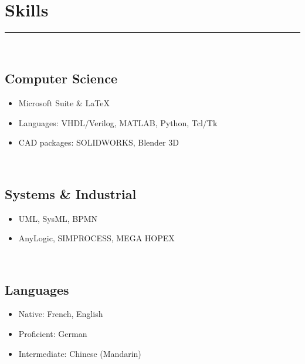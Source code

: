 \documentclass[10pt]{article}
\begin{document}
\section*{Skills}
\rule{\linewidth}{1pt}\\[0.2cm]
\begin{minipage}[t]{0.32\linewidth}
    \subsection*{Computer Science}
    \begin{itemize}
        \item Microsoft Suite \& \LaTeX
        \item Languages: VHDL/Verilog, MATLAB, Python, Tcl/Tk
        \item CAD packages: SOLIDWORKS, Blender 3D
    \end{itemize}
\end{minipage}
~
\begin{minipage}[t]{0.32\linewidth}
    \subsection*{Systems \& Industrial}
    \begin{itemize}
        \item UML, SysML, BPMN
        \item AnyLogic, SIMPROCESS, MEGA HOPEX
    \end{itemize}
\end{minipage}
~
\begin{minipage}[t]{0.32\linewidth}
    \subsection*{Languages}
    \begin{itemize}
        \item Native: French, English
        \item Proficient: German
        \item Intermediate: Chinese (Mandarin)
    \end{itemize}
\end{minipage}
\end{document}
